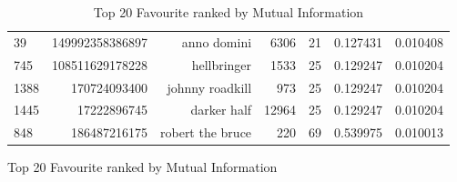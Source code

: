 \documentclass[letterpaper]{article}
\begin{document}
\begin{figure}
\begin{table}
\begin{tabular}{| >{\small}l | >{\small}r | >{\small}r | >{\small}r | >{\small}r | >{\small}r |>{\small}r |}
39   &  149992358386897 &          anno domini &      6306 &       21 &             0.127431 &            0.010408 \\
745  &  108511629178228 &          hellbringer &      1533 &       25 &             0.129247 &            0.010204 \\
1388 &     170724093400 &      johnny roadkill &       973 &       25 &             0.129247 &            0.010204 \\
1445 &      17222896745 &          darker half &     12964 &       25 &             0.129247 &            0.010204 \\
848  &     186487216175 &     robert the bruce &       220 &       69 &             0.539975 &            0.010013 \\
\hline
\end{tabular}
\caption{Top 20 Favourite ranked by Mutual Information}
\label {Top 20 Favourite ranked by Mutual Information}
\end{table}



\end{figure}
\end{document}
